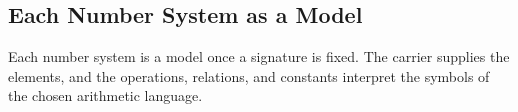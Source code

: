 \subsection{Each Number System as a Model}
\label{subsec:each-number-system-as-a-model}

\begin{remark*}[Exposition]
Each number system is a model once a signature is fixed.  The carrier supplies
the elements, and the operations, relations, and constants interpret the
symbols of the chosen arithmetic language.
\end{remark*}

